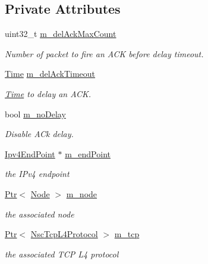 \subsection*{Private Attributes}
\begin{DoxyCompactItemize}
\item 
uint32\+\_\+t \hyperlink{classns3_1_1NscTcpSocketImpl_a6d64d9077fdc95726a129e8a89352e1d}{m\+\_\+del\+Ack\+Max\+Count}
\begin{DoxyCompactList}\small\item\em Number of packet to fire an A\+CK before delay timeout. \end{DoxyCompactList}\item 
\hyperlink{classns3_1_1Time}{Time} \hyperlink{classns3_1_1NscTcpSocketImpl_a9e76d3ac3e18feb169d4538732bb86a5}{m\+\_\+del\+Ack\+Timeout}
\begin{DoxyCompactList}\small\item\em \hyperlink{classns3_1_1Time}{Time} to delay an A\+CK. \end{DoxyCompactList}\item 
bool \hyperlink{classns3_1_1NscTcpSocketImpl_a176dd4a9e23dda76386f8b71104a0f51}{m\+\_\+no\+Delay}
\begin{DoxyCompactList}\small\item\em Disable A\+Ck delay. \end{DoxyCompactList}\item 
\hyperlink{classns3_1_1Ipv4EndPoint}{Ipv4\+End\+Point} $\ast$ \hyperlink{classns3_1_1NscTcpSocketImpl_a42d224bda60f7e75d28f3952f27d1a9c}{m\+\_\+end\+Point}
\begin{DoxyCompactList}\small\item\em the I\+Pv4 endpoint \end{DoxyCompactList}\item 
\hyperlink{classns3_1_1Ptr}{Ptr}$<$ \hyperlink{classns3_1_1Node}{Node} $>$ \hyperlink{classns3_1_1NscTcpSocketImpl_a41ef80cb2b67f55bc3f89918e68a5111}{m\+\_\+node}
\begin{DoxyCompactList}\small\item\em the associated node \end{DoxyCompactList}\item 
\hyperlink{classns3_1_1Ptr}{Ptr}$<$ \hyperlink{classns3_1_1NscTcpL4Protocol}{Nsc\+Tcp\+L4\+Protocol} $>$ \hyperlink{classns3_1_1NscTcpSocketImpl_adbb82752a7cb95d4f3e53f5ed17786f5}{m\+\_\+tcp}
\begin{DoxyCompactList}\small\item\em the associated T\+CP L4 protocol \end{DoxyCompactList}\item 

\end{DoxyCompactItemize}
